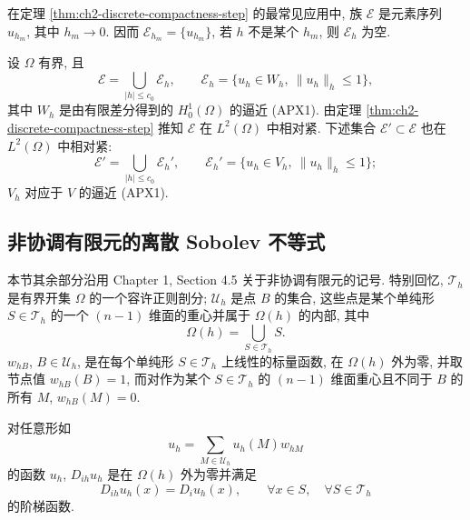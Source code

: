 \hypertarget{chapter-02-page-144}{}
\begin{Remark}
\label{rem:ch2-step-compactness-sequence}
在定理 \ref{thm:ch2-discrete-compactness-step} 的最常见应用中, 族 $\mathcal E$ 是元素序列 $u_{h_m}$, 其中 $h_m\to0$. 因而 $\mathcal E_{h_m}=\{u_{h_m}\}$, 若 $h$ 不是某个 $h_m$, 则 $\mathcal E_h$ 为空.
\end{Remark}

\begin{Remark}
\label{rem:ch2-finite-difference-compactness}
设 $\Omega$ 有界, 且
\begin{equation}
\mathcal E=\bigcup_{|h|\leq c_0}\mathcal E_h,
\qquad\mathcal E_h=\{u_h\in W_h,\ \lVert u_h\rVert_h\leq1\},
\label{eq:ch2-finite-difference-unit-family}
\end{equation}
其中 $W_h$ 是由有限差分得到的 $H_0^1(\Omega)$ 的逼近 (APX1). 由定理 \ref{thm:ch2-discrete-compactness-step} 推知 $\mathcal E$ 在 $L^2(\Omega)$ 中相对紧. 下述集合 $\mathcal E'\subset\mathcal E$ 也在 $L^2(\Omega)$ 中相对紧:
\begin{equation}
\mathcal E'=\bigcup_{|h|\leq c_0}\mathcal E_h',
\qquad\mathcal E_h'=\{u_h\in V_h,\ \lVert u_h\rVert_h\leq1\};
\label{eq:ch2-finite-difference-divfree-family}
\end{equation}
$V_h$ 对应于 $V$ 的逼近 (APX1).
\end{Remark}

\subsection{非协调有限元的离散 Sobolev 不等式}
\label{subsec:ch2-discrete-sobolev-nonconforming}

本节其余部分沿用 Chapter 1, Section 4.5 关于非协调有限元的记号. 特别回忆, $\mathcal T_h$ 是有界开集 $\Omega$ 的一个容许正则剖分; $\mathcal U_h$ 是点 $B$ 的集合, 这些点是某个单纯形 $S\in\mathcal T_h$ 的一个 $(n-1)$ 维面的重心并属于 $\Omega(h)$ 的内部, 其中
\[
\Omega(h)=\bigcup_{S\in\mathcal T_h}S.
\]
$w_{hB}$, $B\in\mathcal U_h$, 是在每个单纯形 $S\in\mathcal T_h$ 上线性的标量函数, 在 $\Omega(h)$ 外为零, 并取节点值 $w_{hB}(B)=1$, 而对作为某个 $S\in\mathcal T_h$ 的 $(n-1)$ 维面重心且不同于 $B$ 的所有 $M$, $w_{hB}(M)=0$.

对任意形如
\begin{equation}
u_h=\sum_{M\in\mathcal U_h}u_h(M)w_{hM}
\label{eq:ch2-nonconforming-expansion}
\end{equation}
的函数 $u_h$, $D_{ih}u_h$ 是在 $\Omega(h)$ 外为零并满足
\[
D_{ih}u_h(x)=D_i u_h(x),
\qquad\forall x\in S,\quad\forall S\in\mathcal T_h
\]
的阶梯函数.

